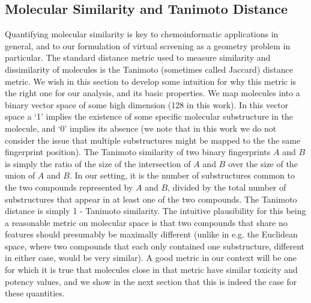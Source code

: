 \documentclass[journal=jacsat,manuscript=article]{achemso}
\begin{document}


\subsection*{Molecular Similarity and Tanimoto Distance}

Quantifying molecular similarity is key to chemoinformatic applications in general\cite{Bender2004b}, and to our formulation of virtual screening as a geometry problem in particular.
The standard distance metric used to measure similarity and dissimilarity of molecules is the Tanimoto (sometimes called Jaccard) distance metric\cite{Bajusz2015}.  We wish in this section to develop some intuition for why this metric is the right one for our analysis, and its basic properties.
We map molecules into a binary vector space of some high dimension (128 in this work). In this vector space a `1' implies the existence of some specific molecular substructure in the molecule, and `0' implies its absence (we note that in this work we do not consider the issue that multiple substructures might be mapped to the the same fingerprint position).  \newline
\newline
The Tanimoto similarity of two binary fingerprints $A$ and $B$ is simply the ratio of the size of the intersection of $A$ and $B$ over the size of the union of $A$ and $B$\cite{Bajusz2015}. In our setting, it is the number of substructures common to the two compounds represented by $A$ and $B$, divided by the total number of substructures that appear in at least one of the two compounds. The Tanimoto distance is simply 1 - Tanimoto similarity.  The intuitive plausibility for this being a reasonable metric on molecular space is that two compounds that share no features should presumably be maximally different (unlike in e.g. the Euclidean space, where two compounds that each only contained one substructure, different in either case, would be very similar).
\newline
\newline
A good metric in our context will be one for which it is true that molecules close in that metric have similar toxicity and potency values, and we show in the next section that this is indeed the case for these quantities.
\end{document}
